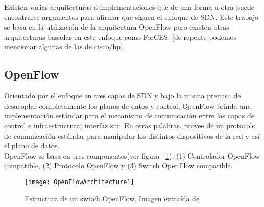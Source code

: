 Existen varias arquitecturas o implementaciones que de una forma u otra puede encontrarse argumentos para afirmar que siguen el enfoque de SDN. Este trabajo se basa en la utilización de la arquitectura OpenFlow pero existen otras arquitecturas basadas en este enfoque como ForCES. [de repente podemos mencionar algunas de las de cisco/hp].

\subsection{OpenFlow}

Orientado por el enfoque en tres capas de SDN y bajo la misma premisa de desacoplar completamente los planos de datos y control, OpenFlow\cite{mckeown2008openflow} brinda una implementaci\'on estándar para el mecanismo de comunicación entre las capas de control e infraestructura; interfaz sur. En otras palabras, provee de un protocolo de comunicación estándar para manipular los distintos dispositivos de la red y así el plano de datos.\\ 

OpenFlow se basa en tres componentes(ver figura ~\ref{fig:OpenFlowArch}): (1) Controlador OpenFlow compatible, (2) Protocolo OpenFlow y (3) Switch OpenFlow compatible.

  


\begin{figure}[htbp!] 
\centering    
\texttt{[image: OpenFlowArchitecture1]}
\caption[Estructura de un switch OpenFlow]{Estructura de un switch OpenFlow. Imagen extraída de \cite{mckeown2008openflow}}
\label{fig:OpenFlowArch}
\end{figure}

